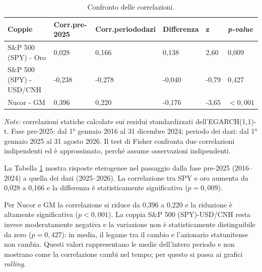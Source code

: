 \begin{table}[H]
    \centering
    \footnotesize
    \begin{tabular}{ p{} p{} p{} p{} p{} p{} }
        \toprule
        \textbf{Coppie} & \textbf{Corr.}\newline \textbf{pre-2025} & \textbf{Corr.}\newline \textbf{periodo}\newline \textbf{dazi} & \textbf{Differenza} & \textbf{z} & \textbf{\emph{p-value}} \\
        \midrule
        S\&P 500 (SPY) - Oro & 0,028 & 0,166 & 0,138 & 2,60 & 0,009 \\ \midrule
        S\&P 500 (SPY) - USD/CNH & -0,238 & -0,278 & -0,040 & -0,79 & 0,427 \\ \midrule
        Nucor - GM & 0,396 & 0,220 & -0,176 & -3,65 & $<0,001$ \\
        \bottomrule
    \end{tabular}
    \vspace{5pt}
    \caption[Confronto delle correlazioni.]{Confronto delle correlazioni.}
    \label{tab:confronto-correlazioni}
    \vspace{2pt}
    \begin{flushleft}
    \emph{Note:} correlazioni statiche calcolate sui residui standardizzati dell'EGARCH(1,1)-t. Fase pre-2025: dal 1° gennaio 2016 al 31 dicembre 2024; periodo dei dazi: dal 1° gennaio 2025 al 31 agosto 2026. Il test di Fisher confronta due correlazioni indipendenti ed è approssimato, perché assume osservazioni indipendenti.
    \end{flushleft}
\end{table}

La Tabella \ref{tab:confronto-correlazioni} mostra risposte eterogenee nel passaggio dalla fase pre-2025 (2016--2024) a quella dei dazi (2025--2026). La correlazione 
tra SPY e oro aumenta da 0,028 a 0,166 e la differenza è statisticamente significativa ($p = 0,009$).

Per Nucor e GM la correlazione si riduce da 0,396 a 0,220 e la riduzione è altamente significativa ($p < 0,001$). La coppia S\&P 500 (SPY)-USD/CNH resta invece moderatamente 
negativa e la variazione non è statisticamente distinguibile da zero ($p = 0,427$): in media, il legame tra il cambio e l'azionario statunitense non cambia. 
Questi valori rappresentano le medie dell'intero periodo e non mostrano come la correlazione cambi nel tempo; per questo si passa ai grafici \emph{rolling}.

